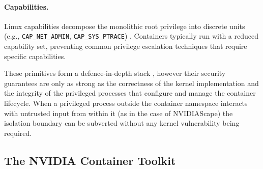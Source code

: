\paragraph{Capabilities.} Linux capabilities decompose the monolithic root privilege into discrete units (e.g., \texttt{CAP\_NET\_ADMIN}, \texttt{CAP\_SYS\_PTRACE}) \cite{linux_capabilities_manpage}. Containers typically run with a reduced capability set, preventing common privilege escalation techniques that require specific capabilities.

These primitives form a defence-in-depth stack \cite{lin2018measurement} \cite{nist_sp800_190}, however their security guarantees are only as strong as the correctness of the kernel implementation and the integrity of the privileged processes that configure and manage the container lifecycle.
When a privileged process outside the container namespace interacts with untrusted input from within it (as in the case of NVIDIAScape) the isolation boundary can be subverted without any kernel vulnerability being required.

\subsection{The NVIDIA Container Toolkit}
\label{subsec:nvidia-ctk}

